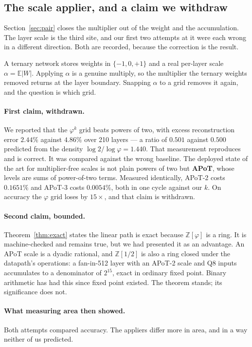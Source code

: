 \documentclass[11pt]{article}
\theoremstyle{definition}
\begin{document}
\subsection{The scale applier, and a claim we withdraw}
\label{sec:scaleapplier}

Section~\ref{sec:pair} closes the multiplier out of the weight and the
accumulation. The layer scale is the third site, and our first two attempts at it
were each wrong in a different direction. Both are recorded, because the
correction is the result.

A ternary network stores weights in $\{-1,0,+1\}$ and a real per-layer scale
$\alpha = \mathbb{E}|W|$. Applying $\alpha$ is a genuine multiply, so the
multiplier the ternary weights removed returns at the layer boundary. Snapping
$\alpha$ to a grid removes it again, and the question is which grid.

\paragraph{First claim, withdrawn.} We reported that the $\varphi^{k}$ grid beats
powers of two, with excess reconstruction error $2.44\%$ against $4.86\%$ over 210
layers --- a ratio of $0.501$ against $0.500$ predicted from the density
$\log 2 / \log\varphi = 1.440$. That measurement reproduces and is correct. It was
compared against the wrong baseline. The deployed state of the art for
multiplier-free scales is not plain powers of two but \textbf{APoT}, whose levels
are sums of power-of-two terms. Measured identically, APoT-2 costs $0.1651\%$ and
APoT-3 costs $0.0054\%$, both in one cycle against our $k$. On accuracy the
$\varphi$ grid loses by $15\times$, and that claim is withdrawn.

\paragraph{Second claim, bounded.} Theorem~\ref{thm:exact} states the linear path
is exact because $\mathbb{Z}[\varphi]$ is a ring. It is machine-checked and
remains true, but we had presented it as an advantage. An APoT scale is a dyadic
rational, and $\mathbb{Z}[1/2]$ is also a ring closed under the datapath's
operations: a fan-in-512 layer with an APoT-2 scale and Q8 inputs accumulates to a
denominator of $2^{15}$, exact in ordinary fixed point. Binary arithmetic has had
this since fixed point existed. The theorem stands; its significance does not.

\paragraph{What measuring area then showed.} Both attempts compared accuracy. The
appliers differ more in area, and in a way neither of us predicted.
\end{document}
